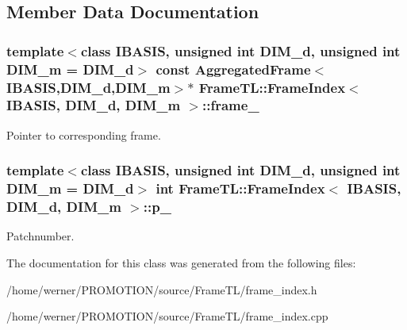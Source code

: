 \subsection{Member Data Documentation}
\hypertarget{classFrameTL_1_1FrameIndex_93c3120c2ff5468dcfb8af0dfe53efd3}{
\subsubsection[frame\_\-]{\setlength{\rightskip}{0pt plus 5cm}template$<$class IBASIS, unsigned int DIM\_\-d, unsigned int DIM\_\-m = DIM\_\-d$>$ const {\bf AggregatedFrame}$<$IBASIS,DIM\_\-d,DIM\_\-m$>$$\ast$ {\bf FrameTL::FrameIndex}$<$ IBASIS, DIM\_\-d, DIM\_\-m $>$::{\bf frame\_\-}}}
\label{classFrameTL_1_1FrameIndex_93c3120c2ff5468dcfb8af0dfe53efd3}


Pointer to corresponding frame. \hypertarget{classFrameTL_1_1FrameIndex_570736897b9ce68ba01a9feccbc5ffc9}{
\subsubsection[p\_\-]{\setlength{\rightskip}{0pt plus 5cm}template$<$class IBASIS, unsigned int DIM\_\-d, unsigned int DIM\_\-m = DIM\_\-d$>$ int {\bf FrameTL::FrameIndex}$<$ IBASIS, DIM\_\-d, DIM\_\-m $>$::{\bf p\_\-}}}
\label{classFrameTL_1_1FrameIndex_570736897b9ce68ba01a9feccbc5ffc9}


Patchnumber. 

The documentation for this class was generated from the following files:\begin{CompactItemize}
\item 
/home/werner/PROMOTION/source/FrameTL/frame\_\-index.h\item 
/home/werner/PROMOTION/source/FrameTL/frame\_\-index.cpp\end{CompactItemize}
